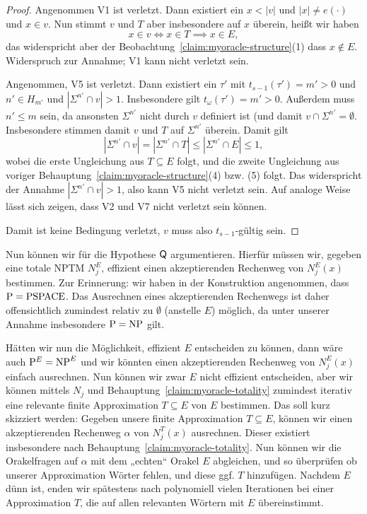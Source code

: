 \begin{proof}
    Angenommen V1 ist verletzt. Dann existiert ein $x<|v|$ und $|x|\neq e(\cdot)$ und $x\in v$.
    Nun stimmt $v$ und $T$ aber insbesondere auf $x$ überein, heißt wir haben
    \[ x\in v \iff x\in T \implies x\in E, \]
    das widerspricht aber der Beobachtung~\ref{claim:myoracle-structure}(1) dass $x\not\in E$.
    Widerspruch zur Annahme; V1 kann nicht verletzt sein.

    Angenommen, V5 ist verletzt. Dann existiert ein $\tau'$ mit $t_{s-1}(\tau')=m'>0$ und $n'\in H_{m'}$ und $|\Sigma^{n'}\cap v|>1$. Insbesondere gilt $t_\omega(\tau')=m'>0$.
    Außerdem muss $n'\leq m$ sein, da ansonsten $\Sigma^{n'}$ nicht durch $v$ definiert ist (und damit $v\cap\Sigma^{n'}=\emptyset$.
    Insbesondere stimmen damit $v$ und $T$ auf $\Sigma^{n'}$ überein.
    Damit gilt
    \[ |\Sigma^{n'}\cap v|=|\Sigma^{n'}\cap T|\leq |\Sigma^{n'}\cap E| \leq 1, \]
    wobei die erste Ungleichung aus $T\subseteq E$ folgt, und die zweite Ungleichung aus voriger Behauptung~\ref{claim:myoracle-structure}(4) bzw. (5) folgt.
    Das widerspricht der Annahme $|\Sigma^{n'}\cap v|>1$, also kann V5 nicht verletzt sein. Auf analoge Weise lässt sich zeigen, dass V2 und V7 nicht verletzt sein können.

    Damit ist keine Bedingung verletzt, $v$ muss also $t_{s-1}$-gültig sein.
\end{proof}

Nun können wir für die Hypothese $\mathsf{Q}$ argumentieren.
Hierfür müssen wir, gegeben eine totale NPTM $N_j^E$, effizient einen akzeptierenden Rechenweg von $N_j^E(x)$ bestimmen.
Zur Erinnerung: wir haben in der Konstruktion angenommen, dass $\mathrm{P}=\mathrm{PSPACE}$.
Das Ausrechnen eines akzeptierenden Rechenwegs ist daher offensichtlich zumindest relativ zu $\emptyset$ (anstelle $E$) möglich, da unter unserer Annahme insbesondere $\mathrm{P}=\mathrm{NP}$ gilt.

Hätten wir nun die Möglichkeit, effizient $E$ entscheiden zu können, dann wäre auch $\mathrm{P}^{E}=\mathrm{NP}^{E}$ und wir könnten einen akzeptierenden Rechenweg von $N_j^E(x)$ einfach ausrechnen.
Nun können wir zwar $E$ nicht effizient entscheiden, aber wir können mittels $N_j$ und Behauptung~\ref{claim:myoracle-totality} zumindest iterativ eine relevante finite Approximation $T\subseteq E$ von $E$ bestimmen.
Das soll kurz skizziert werden: Gegeben unsere finite Approximation $T\subseteq E$, können wir einen akzeptierenden Rechenweg $\alpha$ von $N_j^T(x)$ ausrechnen. Dieser existiert insbesondere nach Behauptung~\ref{claim:myoracle-totality}. Nun können wir die Orakelfragen auf $\alpha$ mit dem „echten“ Orakel $E$ abgleichen, und so überprüfen ob unserer Approximation Wörter fehlen, und diese ggf. $T$ hinzufügen. Nachdem $E$ dünn ist,  enden wir spätestens nach polynomiell vielen Iterationen bei einer Approximation $T$, die auf allen relevanten Wörtern mit $E$ übereinstimmt.



